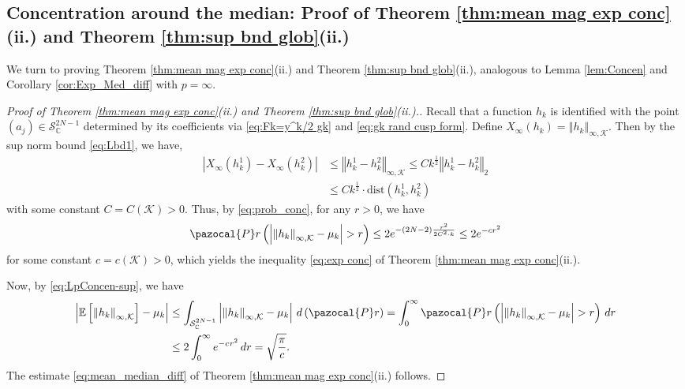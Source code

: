 \documentclass[12pt, a4paper]{amsart}
\theoremstyle{definition}
\newcommand {\1} {\mathbf{1}}
\newcommand{\prob}{\pazocal{P}r}
\newcommand {\Kc} {\mathcal{K}}
\newcommand{\Scc}{{\mathcal{S}}}
\numberwithin{equation}{section}
\begin{document}

\subsection{Concentration around the median: Proof of Theorem \ref{thm:mean mag exp conc}(ii.) and Theorem \ref{thm:sup bnd glob}(ii.)}

We turn to proving Theorem \ref{thm:mean mag exp conc}(ii.) and Theorem \ref{thm:sup bnd glob}(ii.), analogous to Lemma \ref{lem:Concen} and Corollary \ref{cor:Exp_Med_diff}
with $p=\infty$.
\begin{proof}[Proof of Theorem \ref{thm:mean mag exp conc}(ii.) and Theorem \ref{thm:sup bnd glob}(ii.).]
Recall that a function $h_{k}$ is identified with the point $(a_{j})\in \Scc_{\mathbb{C}}^{2N-1}$
determined by its coefficients via \eqref{eq:Fk=y^k/2 gk} and \eqref{eq:gk rand cusp form}. Define $X_{\infty}\left(h_{k}\right)=\left\Vert h_{k}\right\Vert _{\infty,\Kc}$.
Then by the sup norm bound \eqref{eq:Lbd1}, we have,
\begin{align*}
\left|X_{\infty}\left(h_{k}^{1}\right)-X_{\infty}\left(h_{k}^{2}\right)\right| & \le\left\Vert h_{k}^{1}-h_{k}^{2}\right\Vert _{\infty,\Kc}\le Ck^{\frac{1}{2}}\left\Vert h_{k}^{1}-h_{k}^{2}\right\Vert _{2}\\
 & \le Ck^{\frac{1}{2}}\cdot \text{dist}\left(h_{k}^{1},h_{k}^{2}\right)
\end{align*}
with some constant $C=C\left(\Kc\right)>0$. Thus, by \eqref{eq:prob_conc},
for any $r>0$, we have
\begin{equation}
\prob\left(\left|\left\Vert h_{k}\right\Vert _{\infty,\Kc}-\mu_{k}\right|>r\right)\le
2e^{-\left(2N-2\right)\frac{r^{2}}{2C^{2}\cdot k}}\le2e^{-cr^{2}}\label{eq:LpConcen-sup}
\end{equation}
for some constant $c=c\left(\Kc\right)>0$, which yields the inequality \eqref{eq:exp conc} of Theorem \ref{thm:mean mag exp conc}(ii.).

Now, by \eqref{eq:LpConcen-sup}, we have
\begin{align*}
\left|\mathbb{E}\left[\left\Vert h_{k}\right\Vert _{\infty,\Kc}\right]-\mu_{k}\right| & \le\int_{\Scc_{\mathbb{C}}^{2N-1}}\left|\left\Vert h_{k}\right\Vert _{\infty,\Kc}-\mu_{k}\right|\,d\left(\prob\right)=\int_{0}^{\infty}\prob\left(\left|\left\Vert h_{k}\right\Vert _{\infty,\Kc}-\mu_{k}\right|>r\right)\,dr\\
 & \le2\int_{0}^{\infty}e^{-c_{}r^{2}}\,dr=\sqrt{\frac{\pi}{c}}.
\end{align*}
The estimate \eqref{eq:mean_median_diff} of Theorem \ref{thm:mean mag exp conc}(ii.) follows.


\end{proof}
\end{document}
